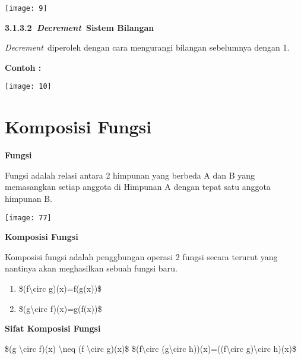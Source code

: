 \documentclass[11pt,fleqn]{book} %
\begin{document}
\begin{myEnumerate}
\begin{itemize}
\begin{center}
\noindent \texttt{[image: 9]}
\end{center}

\noindent 

\noindent \textbf{3.1.3.2~\textit{Decrement~}Sistem Bilangan}

\textit{Decrement~}diperoleh dengan cara mengurangi bilangan sebelumnya dengan 1.

\noindent \textbf{Contoh :}

\begin{center}
\noindent \texttt{[image: 10]}
\end{center}

\noindent 

\noindent

\section{Komposisi Fungsi}

\noindent \textbf{Fungsi}

\noindent Fungsi adalah relasi antara 2 himpunan yang berbeda A dan B yang memasangkan setiap anggota di Himpunan A dengan tepat satu anggota himpunan B.

\begin{center}
\noindent \texttt{[image: 77]}
\end{center}

\noindent \textbf{Komposisi Fungsi }

\noindent Komposisi fungsi adalah penggbungan operasi 2 fungsi secara terurut yang nantinya akan meghasilkan sebuah fungsi baru.

\begin{enumerate}
\item  \$(f{\textbackslash}circ g)(x)=f(g(x))\$

\item  \$(g{\textbackslash}circ f)(x)=g(f(x))\$
\end{enumerate}

\noindent 

\noindent \textbf{Sifat Komposisi Fungsi }

\noindent \$(g {\textbackslash}circ f)(x) {\textbackslash}neq (f {\textbackslash}circ g)(x)\$ \$(f{\textbackslash}circ (g{\textbackslash}circ h))(x)=((f{\textbackslash}circ g){\textbackslash}circ h)(x)\$


\end{itemize}
\end{myEnumerate}
\end{document}
